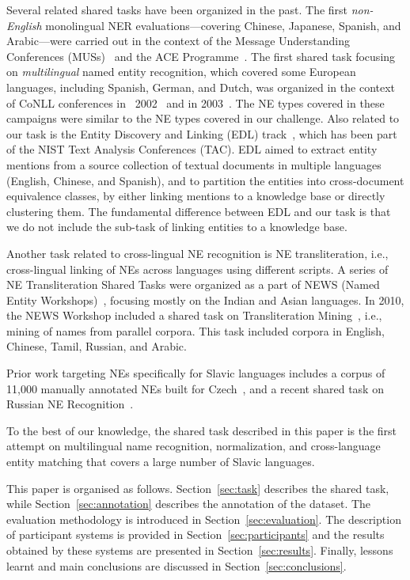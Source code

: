 \documentclass[11pt]{article}
\begin{document}
Several related shared tasks have been organized in the past.  The first
{\em non-English} monolingual NER evaluations---covering Chinese,
Japanese, Spanish, and Arabic---were carried out in the context of the
Message Understanding Conferences (MUSs)~\cite{chinchor:98} and the ACE
Programme~\cite{conf/lrec/DoddingtonMPRSW04}.  The first shared task
focusing on \emph{multilingual} named entity recognition, which covered
some European languages, including Spanish, German, and Dutch, was
organized in the context of CoNLL conferences in
~2002~\cite{TjongKimSang:2002:ICS:1118853.1118877} and in
2003~\cite{TjongKimSang:2003:ICS:1119176.1119195}.  The NE types covered
in these campaigns were similar to the NE types covered in our challenge.
Also related to our task is the Entity Discovery and Linking (EDL)
track~\cite{ji:ea:2014,ji:ea:2015}, which has been part of the NIST Text
Analysis Conferences (TAC).  EDL aimed to extract entity mentions from a
source collection of textual documents in multiple languages (English,
Chinese, and Spanish), and to partition the entities into cross-document
equivalence classes, by either linking mentions to a knowledge base or
directly clustering them.  The fundamental difference between EDL and our
task is that we do not include the sub-task of linking entities to a
knowledge base.

Another task related to cross-lingual NE recognition is NE
transliteration, i.e., cross-lingual linking of NEs across languages
using different scripts.  A series of NE Transliteration Shared Tasks
were organized as a part of NEWS (Named Entity
Workshops)~\cite{duan2016report}, focusing mostly on the Indian and Asian
languages.  In 2010, the NEWS Workshop included a shared task on
Transliteration Mining~\cite{kumaran2010report}, i.e., mining of names
from parallel corpora.  This task included corpora in English, Chinese,
Tamil, Russian, and Arabic.

Prior work targeting NEs specifically
for Slavic languages includes a corpus of 11,000 manually annotated NEs
built for Czech~\cite{vsevvcikova2007named}, and a recent shared task on
Russian NE Recognition~\cite{alexeeva2016factrueval}.

To the best of our knowledge, the shared task described in this paper is
the first attempt on multilingual name recognition, normalization, and
cross-language entity matching that covers a large number of Slavic
languages.

This paper is organised as follows. Section~\ref{sec:task} describes the
shared task, while Section~\ref{sec:annotation} describes the annotation
of the dataset.  The evaluation methodology is introduced in
Section~\ref{sec:evaluation}.  The description of participant systems is
provided in Section~\ref{sec:participants} and the results obtained by
these systems are presented in Section~\ref{sec:results}.  Finally,
lessons learnt and main conclusions are discussed in
Section~\ref{sec:conclusions}.
\end{document}
